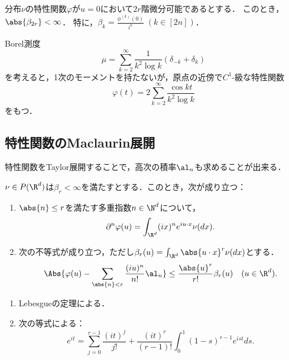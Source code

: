 \documentclass[uplatex,dvipdfmx]{jsreport}
\begin{document}
\begin{proposition}[特性関数の滑らかさが示唆する絶対積率の存在]
    分布$\nu$の特性関数$\varphi$が$u=0$において$2r$階微分可能であるとする．
    このとき，$\abs{\beta_{2r}}<\infty$．
    特に，$\beta_k=\frac{\phi^{(k)}(0)}{i^k}\;(k\in[2n])$．
\end{proposition}
\begin{example}
    Borel測度
    \[\mu=\sum^\infty_{k=2}\frac{1}{k^2\log k}(\delta_{-k}+\delta_k)\]
    を考えると，1次のモーメントを持たないが，原点の近傍で$C^1$-級な特性関数
    \[\varphi(t)=2\sum_{k=2}^\infty\frac{\cos kt}{k^2\log k}\]
    をもつ．
\end{example}

\subsection{特性関数のMaclaurin展開}

\begin{tcolorbox}[colframe=ForestGreen, colback=ForestGreen!10!white,breakable,colbacktitle=ForestGreen!40!white,coltitle=black,fonttitle=\bfseries\sffamily,
title=]
    特性関数をTaylor展開することで，高次の積率$\al_n$も求めることが出来る．
\end{tcolorbox}

\begin{theorem}
    $\nu\in P(\R^d)$は$\beta_r<\infty$を満たすとする．このとき，次が成り立つ：
    \begin{enumerate}
        \item $\abs{n}\le r$を満たす多重指数$n\in\N^d$について，
        \[\partial^n\varphi(u)=\int_{\R^d}(ix)^ne^{iu\cdot x}\nu(dx).\]
        \item 次の不等式が成り立つ，ただし$\beta_r(u)=\int_{\R^d}\abs{u\cdot x}^r\nu(dx)$とする．
        \[\Abs{\varphi(u)-\sum_{\abs{n}<r}\frac{(iu)^n}{n!}\al_n}\le\frac{\abs{u}^r}{r!}\beta_r(u)\quad(u\in\R^d).\]
    \end{enumerate}
\end{theorem}
\begin{Proof}\mbox{}
    \begin{enumerate}
        \item Lebesgueの定理による．
        \item 次の等式による：
        \[e^{it}=\sum_{j=0}^{r-1}\frac{(it)^j}{j!}+\frac{(it)^r}{(r-1)!}\int^1_0(1-s)^{r-1}e^{ist}ds.\]
    \end{enumerate}
\end{Proof}
\end{document}
